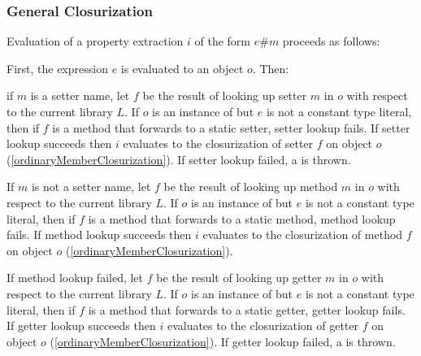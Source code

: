 \documentclass{article}
\begin{document}
\subsubsection{General Closurization}

\LMHash{}
Evaluation of a property extraction $i$ of the form $e\#m$ proceeds as follows:

\LMHash{}
First, the expression $e$ is evaluated to an object $o$.  Then:

\LMHash{}
 if $m$ is a setter name, let $f$ be the result of looking up setter $m$ in $o$ with respect to the current library $L$.   If $o$ is an instance of  but $e$ is not a constant type literal, then if $f$ is a method that forwards to a static setter, setter lookup fails. If setter lookup succeeds then $i$ evaluates to the closurization of setter $f$ on object $o$ (\ref{ordinaryMemberClosurization}). 
 If setter lookup failed, a  is thrown.
 

 
 \LMHash{}
If $m$ is not a setter name, let $f$ be the result of looking up method $m$ in $o$ with respect to the current library $L$.   If $o$ is an instance of  but $e$ is not a constant type literal, then if $f$ is a method that forwards to a static method, method lookup fails. If method lookup succeeds then $i$ evaluates to the closurization of method $f$ on object $o$ (\ref{ordinaryMemberClosurization}).  
 
\LMHash{}
If method lookup failed, let $f$ be the result of looking up getter $m$ in $o$ with respect to the current library $L$.   If $o$ is an instance of  but $e$ is not a constant type literal, then if $f$ is a method that forwards to a static getter, getter lookup fails. If getter lookup succeeds then $i$ evaluates to the closurization of getter $f$ on object $o$ (\ref{ordinaryMemberClosurization}).  
 If getter lookup failed, a  is thrown.
 
\end{document}
